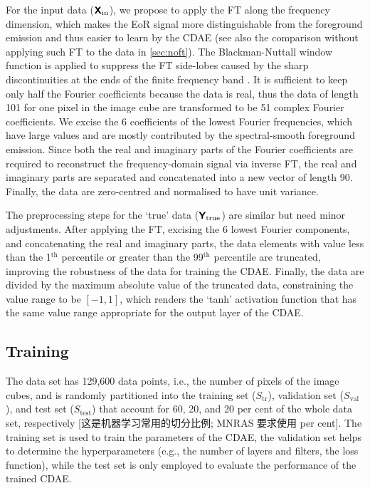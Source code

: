 \documentclass[letters,a4paper,fleqn,usenatbib]{mnras}
\newcommand{\R}[1]{\mathrm{#1}}
\newcommand{\M}[1]{\mathbfss{#1}}
\begin{document}
For the input data ($\M{X}_{\R{in}}$), we propose to apply the FT
along the frequency dimension, which makes the EoR signal more
distinguishable from the foreground emission and thus easier to learn
by the CDAE (see also the comparison without applying such FT to the
data in \autoref{sec:noft}).
The Blackman-Nuttall window function is applied to suppress the
FT side-lobes caused by the sharp discontinuities at the ends
of the finite frequency band \citep[e.g.,][]{chapman2016}.
It is sufficient to keep only half the Fourier coefficients because
the data is real, thus the data of length 101 for one pixel in the
image cube are transformed to be 51 complex Fourier coefficients.
We excise the 6 coefficients of the lowest Fourier frequencies, which
have large values and are mostly contributed by the spectral-smooth
foreground emission.
Since both the real and imaginary parts of the Fourier coefficients
are required to reconstruct the frequency-domain signal via inverse FT,
the real and imaginary parts are separated and concatenated into a new
vector of length 90.
Finally, the data are zero-centred and normalised to have unit variance.

The preprocessing steps for the `true' data ($\M{Y}_{\R{true}}$) are
similar but need minor adjustments.
After applying the FT, excising the 6 lowest Fourier components, and
concatenating the real and imaginary parts,
the data elements with value less than the 1$^{\R{th}}$ percentile or
greater than the 99$^{\R{th}}$ percentile are truncated, improving the
robustness of the data for training the CDAE.
Finally, the data are divided by the maximum absolute value of the
truncated data, constraining the value range to be $[-1, 1]$,
which renders the `tanh' activation function that has the same value
range appropriate for the output layer of the CDAE.


\subsection{Training}
\label{sec:training}

The data set has 129,600 data points, i.e., the number of pixels of
the image cubes, and is randomly partitioned into the
training set ($S_{\R{tr}}$), validation set ($S_{\R{val}}$), and
test set ($S_{\R{test}}$) that account for 60, 20, and 20 per cent of
the whole data set, respectively [这是机器学习常用的切分比例;
MNRAS 要求使用 per cent].
The training set is used to train the parameters of the CDAE,
the validation set helps to determine the hyperparameters (e.g., the
number of layers and filters, the loss function),
while the test set is only employed to evaluate the performance of the
trained CDAE.
\end{document}
